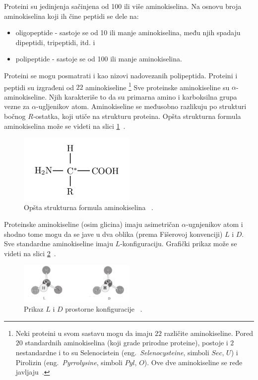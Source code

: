 Proteini su jedinjenja sačinjena od 100 ili više aminokiselina. Na osnovu broja aminokiselina koji ih čine peptidi se dele na:
\begin{itemize}
\item oligopeptide - sastoje se od 10 ili manje aminokiselina, među njih spadaju dipeptidi, tripeptidi, itd. i 
\item polipeptide - sastoje se od 100 ili manje aminokiselina.
\end{itemize}
Proteini se mogu posmatrati i kao nizovi nadovezanih polipeptida.
Proteini i peptidi su izgrađeni od $22$ aminokiseline \footnote{Neki proteini u svom sastavu mogu da imaju $22$ različite aminokiseline. Pored $20$ standardnih aminokiselina (koji grade prirodne proteine), postoje i $2$ nestandardne i to su Selenocistein (eng.~{\em Selenocysteine}, simboli $Sec$, $U$) i Pirolizin (eng.~{\em Pyrrolysine},
simboli $Pyl$, $O$). Ove dve aminokiseline se ređe javljaju~\cite{MarijaJ}.}
Sve proteinske aminokiseline su $\alpha$-aminokiseline. Njih karakteriše to da su primarna amino i karboksilna grupa vezne za $\alpha$-ugljenikov atom. Aminokiseline se međusobno razlikuju po strukturi bočnog $R$-ostatka, koji utiče na strukturu proteina. Opšta strukturna formula aminokiselina može se videti na slici \ref{fig:aminokiselina}~\cite{Principi}. 
\begin{figure}[h]
	\centering
    \includegraphics[width=0.5\textwidth]{Figures/BO/aminokiselina.png}
    \caption{Opšta strukturna formula aminokiselina ~\cite{Principi}.}
    \label{fig:aminokiselina}
\end{figure}
Proteinske aminokiseline (osim glicina) imaju asimetričan $\alpha$-ugnjenikov atom i shodno tome mogu da se jave u dva oblika (prema Fišerovoj konvenciji) $L$ i $D$. Sve standardne aminokiseline imaju $L$-konfiguraciju. Grafički prikaz može se videti na slici \ref{fig:LDkonfig}~\cite{Principi}.
\begin{figure}[h]
	\centering
    \includegraphics[width=0.5\textwidth]{Figures/BO/LDkonfig.png}
    \caption{Prikaz $L$ i $D$ prostorne konfiguracije ~\cite{Principi}.}
    \label{fig:LDkonfig}
\end{figure}
